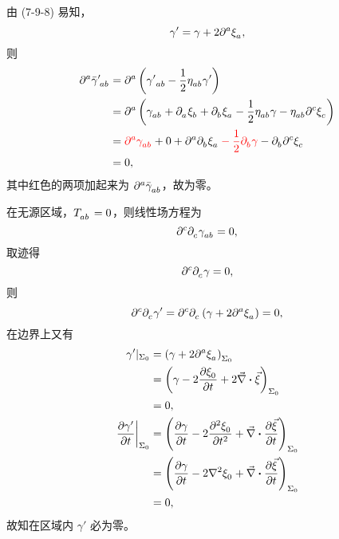 \begin{xiti}
		\begin{zm}
			由 (7-9-8) 易知，
			\begin{equation*}
				\gamma' = \gamma + 2 \tensor{\partial}{^a} \tensor{\xi}{_a},
			\end{equation*}
			则
			\begin{equation*}
				\begin{split}
					\tensor{\partial}{^a} \tensor{{\bar{\gamma}}}{^\prime_a_b} &= \tensor{\partial}{^a} \left( \tensor{{\gamma'}}{_a_b} - \frac{1}{2} \tensor{\eta}{_a_b} \gamma' \right)\\
					&= \tensor{\partial}{^a} \left( \tensor{{\gamma}}{_a_b} + \Partial{a} \tensor{\xi}{_b} + \Partial{b} \tensor{\xi}{_a} - \frac{1}{2} \tensor{\eta}{_a_b} \gamma - \tensor{\eta}{_a_b} \tensor{\partial}{^c} \tensor{\xi}{_c} \right)\\
					&= {\color{red} \tensor{\partial}{^a} \tensor{\gamma}{_a_b}} + 0 + \tensor{\partial}{^a} \tensor{\partial}{_b} \tensor{\xi}{_a}  {\color{red} {}-\frac{1}{2} \Partial{b} \gamma} - \Partial{b} \tensor{\partial}{^c} \tensor{\xi}{_c}\\
					&= 0,
				\end{split}
			\end{equation*}
			其中红色的两项加起来为 $\tensor{\partial}{^a} \tensor{\bar{\gamma}}{_a_b}$，故为零。

			在无源区域，$\tensor{T}{_a_b} = 0$，则线性场方程为
			\begin{equation*}
				\tensor{\partial}{^c} \tensor{\partial}{_c} \tensor{\gamma}{_a_b} = 0,
			\end{equation*}
			取迹得
			\begin{equation*}
				\tensor{\partial}{^c} \tensor{\partial}{_c} \gamma = 0,
			\end{equation*}
			则
			\begin{equation*}
				\tensor{\partial}{^c} \tensor{\partial}{_c} \gamma' = \tensor{\partial}{^c} \tensor{\partial}{_c} \left( \gamma + 2 \tensor{\partial}{^a} \tensor{\xi}{_a} \right) = 0,
			\end{equation*}
			在边界上又有
			\begin{equation*}
				\begin{split}
					\gamma'|_{\Sigma_0} &= \left( \gamma + 2 \tensor{\partial}{^a} \tensor{\xi}{_a} \right)_{\Sigma_0}\\
					&= \left( \gamma - 2 \pdv{\tensor{\xi}{_0}}{t} + 2 \myvec{\nabla} \vdot \myvec{\xi} \right)_{\Sigma_0}\\
					&= 0,\\
					\left. \pdv{\gamma'}{t} \right|_{\Sigma_0} &= \left( \pdv{\gamma}{t} - 2 \pdv[2]{\tensor{\xi}{_0}}{t} + \myvec{\nabla} \vdot \pdv{\myvec{\xi}}{t} \right)_{\Sigma_0}\\
					&= \left( \pdv{\gamma}{t} - 2 \nabla^2 \tensor{\xi}{_0} + \myvec{\nabla} \vdot \pdv{\myvec{\xi}}{t} \right)_{\Sigma_0}\\
					&= 0,
				\end{split}
			\end{equation*}
			故知在区域内 $\gamma'$ 必为零。


\end{zm}
\end{xiti}
